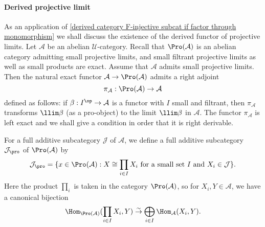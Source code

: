 \paragraph{Derived projective limit}
As an application of \cref{derived category F-injective subcat if factor through monomorphism} we shall discuss the existence of the derived functor of projective limits. Let $\mathcal{A}$ be an abelian $\mathscr{U}$-category. Recall that $\Pro(\mathcal{A})$ is an abelian category admitting small projective limits, and small filtrant projective limits as well as small products are exact. Assume that $\mathcal{A}$ admits small projective limits. Then the natural exact functor $\mathcal{A}\to\Pro(\mathcal{A})$ admits a right adjoint
\[\pi_\mathcal{A}:\Pro(\mathcal{A})\to\mathcal{A}\]
defined as follows: if $\beta:I^{\op}\to\mathcal{A}$ is a functor with $I$ small and filtrant, then $\pi_\mathcal{A}$ transforms $\llim\beta$ (as a pro-object) to the limit $\llim\beta$ in $\mathcal{A}$. The functor $\pi_\mathcal{A}$ is left exact and we shall give a condition in order that it is right derivable.\par
For a full additive subcategory $\mathcal{J}$ of $\mathcal{A}$, we define a full additive subcategory $\mathcal{J}_{\pro}$ of $\Pro(\mathcal{A})$ by
\[\mathcal{J}_{\pro}=\{x\in\Pro(\mathcal{A}):\text{$X\cong\prod_{i\in I}X_i$ for a small set $I$ and $X_i\in\mathcal{J}$}\}.\]
Here the product $\prod_i$ is taken in the category $\Pro(\mathcal{A})$, so for $X_i,Y\in\mathcal{A}$, we have a canonical bijection
\[\Hom_{\Pro(\mathcal{A})}(\prod_{i\in I}X_i,Y)\stackrel{\sim}{\to} \bigoplus_{i\in I}\Hom_{\mathcal{A}}(X_i,Y).\]

